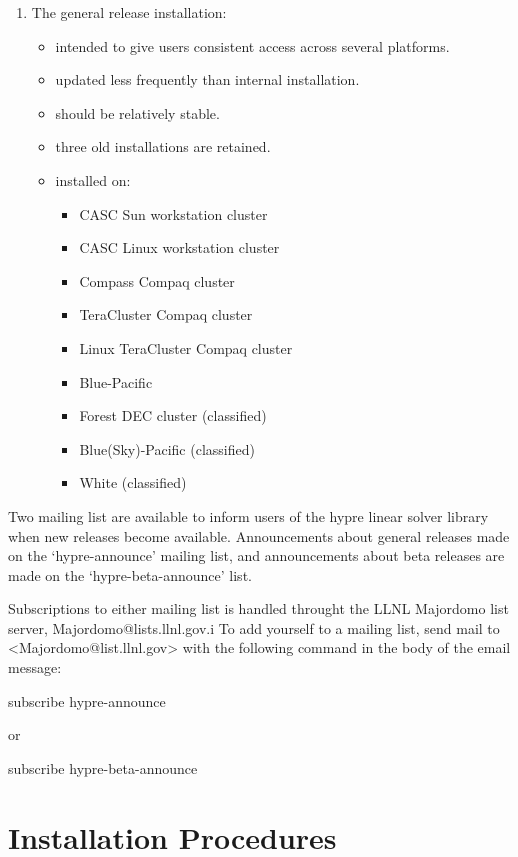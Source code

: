 \begin{enumerate}
\item The general release installation:
   \begin{itemize}
   \item intended to give users consistent access across several platforms.
   \item updated less frequently than internal installation.
   \item should be relatively stable.
   \item three old installations are retained.
   \item installed on:
      \begin{itemize}
       \item CASC Sun workstation cluster
       \item CASC Linux workstation cluster
       \item Compass Compaq cluster
       \item TeraCluster Compaq cluster
       \item Linux TeraCluster Compaq cluster
       \item Blue-Pacific
       \item Forest DEC cluster  (classified)
       \item Blue(Sky)-Pacific   (classified)
       \item White               (classified)
      \end{itemize}
   \end{itemize}

\end{enumerate}

Two mailing list are available to inform users of the hypre
linear solver library when new releases become available.
Announcements about general releases made on the `hypre-announce'
mailing list, and announcements about beta releases are made on the
`hypre-beta-announce' list. 

Subscriptions to either mailing list is handled throught the LLNL
Majordomo list server, Majordomo@lists.llnl.gov.i To add yourself
to a mailing list, send mail to <Majordomo@list.llnl.gov> with
the following command in the body of the email message:

 subscribe hypre-announce

or

 subscribe hypre-beta-announce

\section{Installation Procedures}
\label{Installation Procedures}

